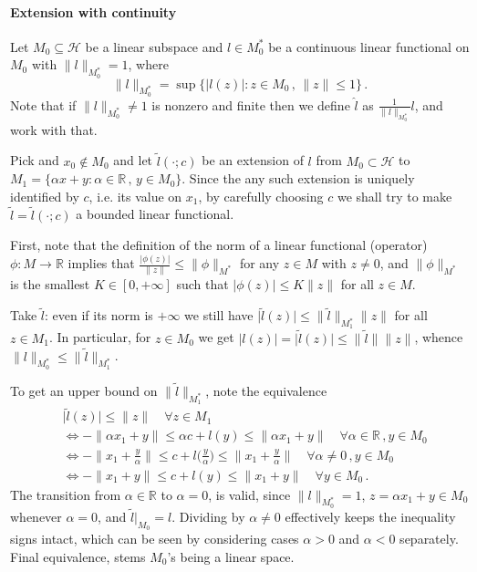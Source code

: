\documentclass[a4paper]{article}
\newcommand{\Hcal}{\mathcal{H}}
\newcommand{\real}{\mathbb{R}}
\begin{document}

\paragraph{Extension with continuity} %
\label{par:extension_with_continuity}

Let $M_0 \subseteq \Hcal$ be a linear subspace and $l\in M_0^*$ be a continuous
linear functional on $M_0$ with $\|l\|_{M_0^*} = 1$, where
\begin{equation*}
  \|l\|_{M_0^*}
    = \sup\bigl\{\lvert l(z) \rvert\colon
        z\in M_0\,,
        \,\|z\|\leq 1
      \bigr\}
    \,.
\end{equation*}
Note that if $\|l\|_{M_0^*} \neq 1$ is nonzero and finite then we define $\hat{l}$
as $\tfrac1{\|l\|_{M_0^*}} l$, and work with that.

Pick and $x_0\notin M_0$ and let $\tilde{l}(\cdot; c)$ be an extension of $l$ from
$M_0\subset \Hcal$ to $M_1 = \{\alpha x + y \colon \alpha \in \real\,,\, y \in M_0\}$.
Since the any such extension is uniquely identified by $c$, i.e. its value on $x_1$,
by carefully choosing $c$ we shall try to make $\tilde{l} = \tilde{l}(\cdot; c)$ a
bounded linear functional.

First, note that the definition of the norm of a linear functional (operator) $\phi
\colon M\to \real$ implies that $\tfrac{\lvert \phi(z) \rvert}{\|z\|} \leq \|\phi\|_{M^*}$
for any $z\in M$ with $z \neq 0$, and $\|\phi\|_{M^*}$ is the smallest $K\in [0,
+\infty]$ such that $\lvert \phi(z) \rvert \leq K \|z\|$ for all $z\in M$.

Take $\tilde{l}$: even if its norm is $+\infty$ we still have $\lvert \tilde{l}(z)\rvert
\leq \|\tilde{l}\|_{M_1^*} \|z\|$ for all $z\in M_1$. In particular, for $z\in M_0$
we get $\lvert l(z)\rvert = \lvert \tilde{l}(z)\rvert \leq \|\tilde{l}\| \|z\|$,
whence $\|l\|_{M_0^*} \leq \|\tilde{l}\|_{M_1^*}$.

To get an upper bound on $\|\tilde{l}\|_{M_1^*}$, note the equivalence
\begin{align*}
  &\lvert \tilde{l}(z) \rvert \leq \|z\|
      \quad \forall z \in M_1
  \\ &\Leftrightarrow
    - \|\alpha x_1 + y\|
      \leq \alpha c + l(y)
      \leq \|\alpha x_1 + y\|
      \quad \forall \alpha \in \real\,, y \in M_0
  \\ &\Leftrightarrow
    - \bigl\|x_1 + \tfrac{y}\alpha\bigr\|
      \leq c + l\bigl(\tfrac{y}\alpha\bigr) \leq
        \bigl\|x_1 + \tfrac{y}\alpha\bigr\|
      \quad \forall \alpha \neq 0\,, y \in M_0
  \\ &\Leftrightarrow
    - \|x_1 + y\| \leq c + l(y) \leq \|x_1 + y\|
      \quad \forall y \in M_0
    \,.
\end{align*}
The transition from $\alpha \in \real$ to $\alpha = 0$, is valid, since $\|l\|_{M_0^*}
= 1$, $z = \alpha x_1 + y \in M_0$ whenever $\alpha = 0$, and $\tilde{l}\big\vert_{M_0}
= l$. Dividing by $\alpha \neq 0$ effectively keeps the inequality signs intact, which
can be seen by considering cases $\alpha > 0$ and $\alpha < 0$ separately. Final
equivalence, stems $M_0$'s being a linear space.
\end{document}
